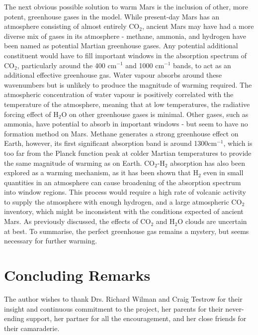 \documentclass[12pt,onecolumn]{revtex4-2}    %
\begin{document}
The next obvious possible solution to warm Mars is the inclusion of other, more potent, greenhouse gases in the model. While present-day Mars has an atmosphere consisting of almost entirely $\mathrm{CO_2}$, ancient Mars may have had a more diverse mix of gases in its atmosphere - methane, ammonia, and hydrogen have been named as potential Martian greenhouse gases. Any potential additional constituent would have to fill important windows in the absorption spectrum of $\mathrm{CO_2}$, particularly around the 400 cm$^{-1}$ and 1000 cm$^{-1}$ bands, to act as an additional effective greenhouse gas. Water vapour absorbs around these wavenumbers but is unlikely to produce the magnitude of warming required. The atmospheric concentration of water vapour is positively correlated with the temperature of the atmosphere, meaning that at low temperatures, the radiative forcing effect of $\mathrm{H_2O}$ on other greenhouse gases is minimal. Other gases, such as ammonia, have potential to absorb in important windows - but seem to have no formation method on Mars. Methane generates a strong greenhouse effect on Earth, however, its first significant absorption band is around 1300cm$^{-1}$, which is too far from the Planck function peak at colder Martian temperatures to provide the same magnitude of warming as on Earth. $\mathrm{CO_2}$-$\mathrm{H_2}$ absorption has also been explored as a warming mechanism, as it has been shown that $\mathrm{H_2}$ even in small quantities in an atmosphere can cause broadening of the absorption spectrum into window regions. This process would require a high rate of volcanic activity to supply the atmosphere with enough hydrogen, and a large atmospheric $\mathrm{CO_2}$ inventory, which might be inconsistent with the conditions expected of ancient Mars. As previously discussed, the effects of $\mathrm{CO_2}$ and $\mathrm{H_2O}$ clouds are uncertain at best. To summarise, the perfect greenhouse gas remains a mystery, but seems necessary for further warming.

\section{Concluding Remarks}

\begin{acknowledgments}
The author wishes to thank Drs. Richard Wilman and Craig Testrow for their insight and continuous commitment to the project, her parents for their never-ending support, her partner for all the encouragement, and her close friends for their camaraderie.
\end{acknowledgments}
\end{document}
